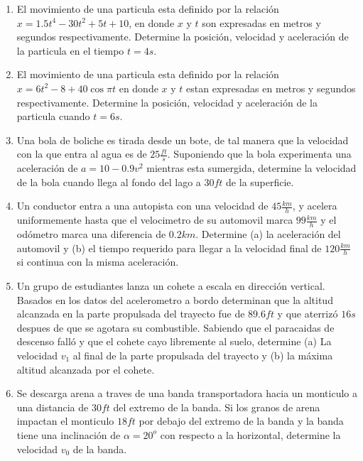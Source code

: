 \begin{enumerate}

	\item El movimiento de una particula esta definido por la relación $x = 1.5t^4 - 30t^2 + 5t + 10$, en donde $x$ y $t$ son expresadas en metros y segundos respectivamente. Determine la posición, velocidad y aceleración de la particula en el tiempo $t = 4s$.

	\item El movimiento de una particula esta definido por la relación $x = 6t^2 - 8 + 40\cos{\pi t}$ en donde $x$ y $t$ estan expresadas en metros y segundos respectivamente. Determine la posición, velocidad y aceleración de la particula cuando $t = 6s$.

	\item Una bola de boliche es tirada desde un bote, de tal manera que la velocidad con la que entra al agua es de $25 \frac{ft}{s}$. Suponiendo que la bola experimenta una aceleración de $a = 10 - 0.9v^2$ mientras esta sumergida, determine la velocidad de la bola cuando llega al fondo del lago a $30 ft$ de la superficie.

	\item Un conductor entra a una autopista con una velocidad de $45 \frac{km}{h}$, y acelera uniformemente hasta que el velocimetro de su automovil marca $99 \frac{km}{h}$ y el odómetro marca una diferencia de $0.2 km$. Determine (a) la aceleración del automovil y (b) el tiempo requerido para llegar a la velocidad final de $120 \frac{km}{h}$ si continua con la misma aceleración.

	\item Un grupo de estudiantes lanza un cohete a escala en dirección vertical. Basados en los datos del acelerometro a bordo determinan que la altitud alcanzada en la parte propulsada del trayecto fue de $89.6ft$ y que aterrizó $16s$ despues de que se agotara su combustible. Sabiendo que el paracaidas de descenso falló y que el cohete cayo libremente al suelo, determine (a) La velocidad $v_1$ al final de la parte propulsada del trayecto y (b) la máxima altitud alcanzada por el cohete.

	\item Se descarga arena a traves de una banda transportadora hacia un monticulo a una distancia de $30 ft$ del extremo de la banda. Si los granos de arena impactan el monticulo $18 ft$ por debajo del extremo de la banda y la banda tiene una inclinación de $\alpha = 20^o$ con respecto a la horizontal, determine la velocidad $v_0$ de la banda.


\end{enumerate}
